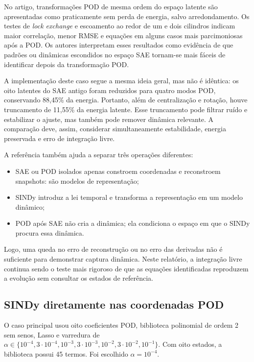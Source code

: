 \documentclass[12pt,a4paper]{article}
\begin{document}
No artigo, transformações POD de mesma ordem do espaço latente são apresentadas como praticamente sem perda de energia, salvo arredondamento. Os testes de \emph{lock exchange} e escoamento ao redor de um e dois cilindros indicam maior correlação, menor RMSE e equações em alguns casos mais parcimoniosas após a POD. Os autores interpretam esses resultados como evidência de que padrões ou dinâmicas escondidos no espaço SAE tornam-se mais fáceis de identificar depois da transformação POD.

A implementação deste caso segue a mesma ideia geral, mas não é idêntica: os oito latentes do SAE antigo foram reduzidos para quatro modos POD, conservando 88,45\% da energia. Portanto, além de centralização e rotação, houve truncamento de 11,55\% da energia latente. Esse truncamento pode filtrar ruído e estabilizar o ajuste, mas também pode remover dinâmica relevante. A comparação deve, assim, considerar simultaneamente estabilidade, energia preservada e erro de integração livre.

A referência também ajuda a separar três operações diferentes:
\begin{itemize}
  \item SAE ou POD isolados apenas constroem coordenadas e reconstroem snapshots: são modelos de representação;
  \item SINDy introduz a lei temporal e transforma a representação em um modelo dinâmico;
  \item POD após SAE não cria a dinâmica; ela condiciona o espaço em que o SINDy procura essa dinâmica.
\end{itemize}

Logo, uma queda no erro de reconstrução ou no erro das derivadas não é suficiente para demonstrar captura dinâmica. Neste relatório, a integração livre continua sendo o teste mais rigoroso de que as equações identificadas reproduzem a evolução sem consultar os estados de referência.

\subsection{SINDy diretamente nas coordenadas POD}
O caso principal usou oito coeficientes POD, biblioteca polinomial de ordem 2 sem senos, Lasso e varredura de $\alpha\in\{10^{-4},3\cdot10^{-4},10^{-3},3\cdot10^{-3},10^{-2},3\cdot10^{-2},10^{-1}\}$. Com oito estados, a biblioteca possui 45 termos. Foi escolhido $\alpha=10^{-4}$.
\end{document}
